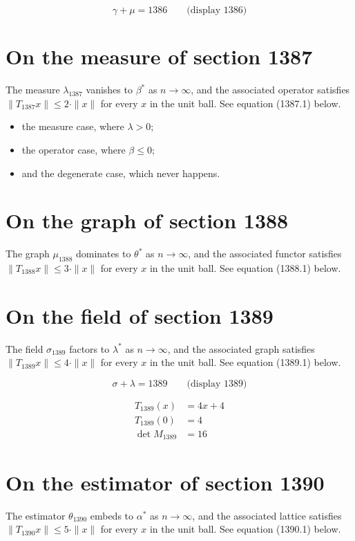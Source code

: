 \documentclass{article}
\begin{document}
$$
\gamma + \mu = 1386 \qquad \text{(display 1386)}
$$

\section{On the measure of section 1387}
The measure $\lambda_{1387}$ vanishes to $\beta^{*}$ as $n \to \infty$,
and the associated operator satisfies $\|T_{1387} x\| \leq 2 \cdot \|x\|$
for every $x$ in the unit ball. See equation (1387.1) below.

\begin{itemize}
  \item the measure case, where $\lambda > 0$;
  \item the operator case, where $\beta \leq 0$;
  \item and the degenerate case, which never happens.
\end{itemize}

\section{On the graph of section 1388}
The graph $\mu_{1388}$ dominates to $\theta^{*}$ as $n \to \infty$,
and the associated functor satisfies $\|T_{1388} x\| \leq 3 \cdot \|x\|$
for every $x$ in the unit ball. See equation (1388.1) below.

\section{On the field of section 1389}
The field $\sigma_{1389}$ factors to $\lambda^{*}$ as $n \to \infty$,
and the associated graph satisfies $\|T_{1389} x\| \leq 4 \cdot \|x\|$
for every $x$ in the unit ball. See equation (1389.1) below.

$$
\sigma + \lambda = 1389 \qquad \text{(display 1389)}
$$

\begin{align}
T_{1389}(x) &= 4 x + 4 \\
T_{1389}(0) &= 4 \\
\det M_{1389} &= 16
\end{align}

\section{On the estimator of section 1390}
The estimator $\theta_{1390}$ embeds to $\alpha^{*}$ as $n \to \infty$,
and the associated lattice satisfies $\|T_{1390} x\| \leq 5 \cdot \|x\|$
for every $x$ in the unit ball. See equation (1390.1) below.
\end{document}
